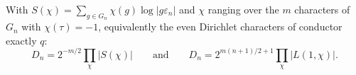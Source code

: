 With $S(\chi)=\sum_{g\in G_n}\chi(g)\log|g\varepsilon_n|$ and $\chi$ ranging over the $m$ characters of $G_n$ with $\chi(\tau)=-1$, equivalently the even Dirichlet characters of conductor exactly $q$:
\[ D_n=2^{-m/2}\prod_{\chi}|S(\chi)|\qquad\text{and}\qquad D_n=2^{m(n+1)/2+1}\prod_{\chi}|L(1,\chi)| .\]
